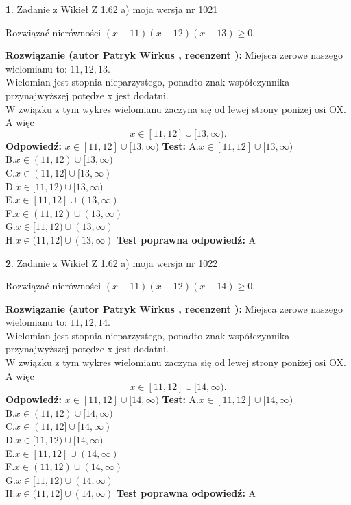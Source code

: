 \documentclass[12pt, a4paper]{article}
\theoremstyle{definition} %
\newtheorem{zad}{}
\newcommand{\zadStart}[1]{\begin{zad}#1\newline}
\newcommand{\zadStop}{\end{zad}}
\newcommand{\rozwStart}[2]{\noindent \textbf{Rozwiązanie (autor #1 , recenzent #2): }\newline}
\newcommand{\rozwStop}{\newline}
\newcommand{\odpStart}{\noindent \textbf{Odpowiedź:}\newline}
\newcommand{\odpStop}{\newline}
\newcommand{\testStart}{\noindent \textbf{Test:}\newline}
\newcommand{\testStop}{\newline}
\newcommand{\kluczStart}{\noindent \textbf{Test poprawna odpowiedź:}\newline}
\newcommand{\kluczStop}{\newline}
\begin{document}
\zadStart{Zadanie z Wikieł Z 1.62 a) moja wersja nr 1021}

Rozwiązać nierówności $(x-11)(x-12)(x-13)\ge0$.
\zadStop
\rozwStart{Patryk Wirkus}{}
Miejsca zerowe naszego wielomianu to: $11, 12, 13$.\\
Wielomian jest stopnia nieparzystego, ponadto znak współczynnika przy\linebreak najwyższej potędze x jest dodatni.\\ W związku z tym wykres wielomianu zaczyna się od lewej strony poniżej osi OX. A więc $$x \in [11,12] \cup [13,\infty).$$
\rozwStop
\odpStart
$x \in [11,12] \cup [13,\infty)$
\odpStop
\testStart
A.$x \in [11,12] \cup [13,\infty)$\\
B.$x \in (11,12) \cup [13,\infty)$\\
C.$x \in (11,12] \cup [13,\infty)$\\
D.$x \in [11,12) \cup [13,\infty)$\\
E.$x \in [11,12] \cup (13,\infty)$\\
F.$x \in (11,12) \cup (13,\infty)$\\
G.$x \in [11,12) \cup (13,\infty)$\\
H.$x \in (11,12] \cup (13,\infty)$
\testStop
\kluczStart
A
\kluczStop



\zadStart{Zadanie z Wikieł Z 1.62 a) moja wersja nr 1022}

Rozwiązać nierówności $(x-11)(x-12)(x-14)\ge0$.
\zadStop
\rozwStart{Patryk Wirkus}{}
Miejsca zerowe naszego wielomianu to: $11, 12, 14$.\\
Wielomian jest stopnia nieparzystego, ponadto znak współczynnika przy\linebreak najwyższej potędze x jest dodatni.\\ W związku z tym wykres wielomianu zaczyna się od lewej strony poniżej osi OX. A więc $$x \in [11,12] \cup [14,\infty).$$
\rozwStop
\odpStart
$x \in [11,12] \cup [14,\infty)$
\odpStop
\testStart
A.$x \in [11,12] \cup [14,\infty)$\\
B.$x \in (11,12) \cup [14,\infty)$\\
C.$x \in (11,12] \cup [14,\infty)$\\
D.$x \in [11,12) \cup [14,\infty)$\\
E.$x \in [11,12] \cup (14,\infty)$\\
F.$x \in (11,12) \cup (14,\infty)$\\
G.$x \in [11,12) \cup (14,\infty)$\\
H.$x \in (11,12] \cup (14,\infty)$
\testStop
\kluczStart
A
\kluczStop
\end{document}

